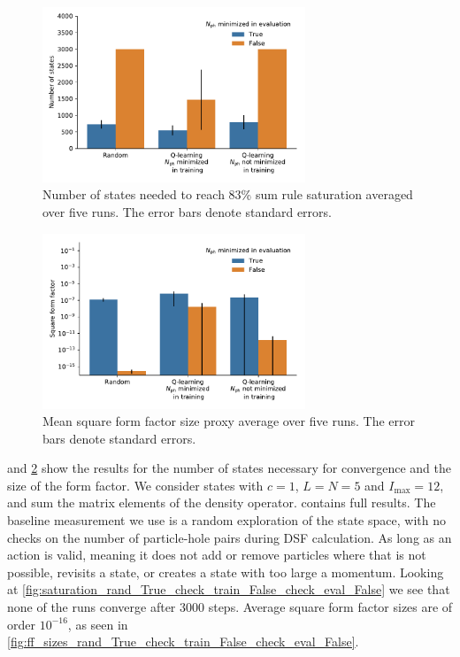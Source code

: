 \documentclass[11pt, a4paper]{report} %
\begin{document}
\begin{figure}[tb!]
  \centering
  \includegraphics[width=0.7\textwidth]{statestoconv.pdf}
  \caption{Number of states needed to reach 83\% sum rule saturation averaged over five runs. The error bars denote standard errors.}\label{fig:statestoconv}
\end{figure}

\begin{figure}[tb!]
  \centering
  \includegraphics[width=0.7\textwidth]{ffsizesproxy.pdf}
  \caption{Mean square form factor size proxy average over five runs. The error bars denote standard errors.}\label{fig:ffsizeproxy}
\end{figure}


 and \cref{fig:ffsizeproxy} show the results for the number of states necessary for convergence and the size of the form factor.
We consider states with \(c=1\), \(L=N=5\) and \(I_{\max}=12\), and sum the matrix elements of the density operator.
 contains full results.
The baseline measurement we use is a random exploration of the state space, with no checks on the number of particle-hole pairs during DSF calculation.
As long as an action is valid, meaning it does not add or remove particles where that is not possible, revisits a state, or creates a state with too large a momentum.
Looking at \cref{fig:saturation_rand_True_check_train_False_check_eval_False} we see that none of the runs converge after 3000 steps.
Average square form factor sizes are of order \(10^{-16}\), as seen in \cref{fig:ff_sizes_rand_True_check_train_False_check_eval_False}.
\end{document}
